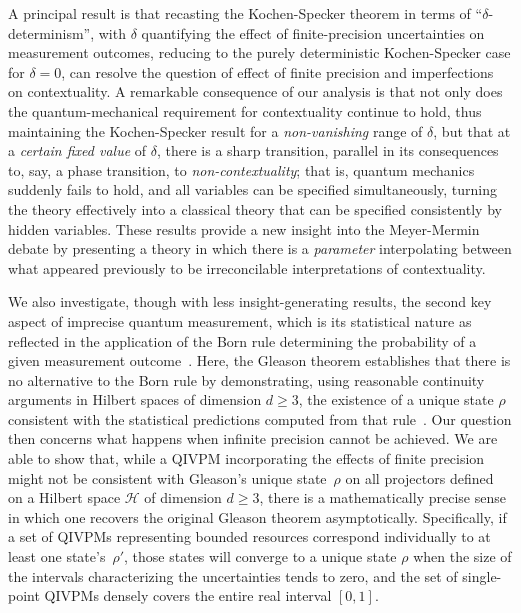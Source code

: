 \documentclass[english,reprint, aps, prl,superscriptaddress, showpacs,
showkeys, longbibliography, amsmath, amssymb]{revtex4-1}
\theoremstyle{plain}
\theoremstyle{definition}
\newcommand{\Hilb}{\mathcal{H}}
\begin{document}
A principal result is that recasting the Kochen-Specker theorem in
terms of ``$\delta$-determinism'', with $\delta$ 
quantifying the effect of finite-precision uncertainties on measurement 
outcomes, reducing to the purely deterministic
Kochen-Specker case for $\delta=0$, can resolve the question of effect
of finite precision and imperfections on contextuality.  A remarkable
consequence of our analysis is that not only does the
quantum-mechanical requirement for contextuality continue to hold,
thus maintaining the Kochen-Specker result for a \emph{non-vanishing}
range of $\delta$, but that at a \emph{certain fixed value} of
$\delta$, there is a sharp transition, parallel in its consequences
to, say, a phase transition, to \emph{non-contextuality}; that is,
quantum mechanics suddenly fails to hold, and all variables can be
specified simultaneously, turning the theory effectively into a
classical theory that can be specified consistently by hidden
variables.  These results provide a new insight into the
Meyer-Mermin debate by presenting a theory in which there is a
\emph{parameter} interpolating between what appeared previously to be
irreconcilable interpretations of contextuality.


We also investigate, though with less insight-generating results, the
second key aspect of imprecise quantum measurement, which is its
statistical nature as reflected in the application of the Born rule
determining the probability of a given measurement
outcome~\citep{Born1983,peres1995quantum,544199}.  Here, the Gleason
theorem establishes that there is no alternative to the Born rule by
demonstrating, using reasonable continuity arguments in Hilbert spaces
of dimension $d\ge3$, the existence of a unique state $\rho$
consistent with the statistical predictions computed from that
rule~\citep{gleason1957,Redhead1987-REDINA,peres1995quantum}.  Our
question then concerns what happens when infinite precision cannot be
achieved.  We are able to show that, while a QIVPM incorporating the
effects of finite precision might not be consistent with Gleason's
unique state~$\rho$ on all projectors defined on a Hilbert space
$\Hilb$ of dimension $d\ge3$, there is a mathematically precise sense
in which one recovers the original Gleason theorem asymptotically.
Specifically, if a set of QIVPMs representing bounded resources
correspond individually to at least one state's~$\rho'$, those states
will converge to a unique state $\rho$ when the size of the intervals
characterizing the uncertainties tends to zero, and the set of
single-point QIVPMs densely covers the entire real interval $[0,1]$.
\end{document}
